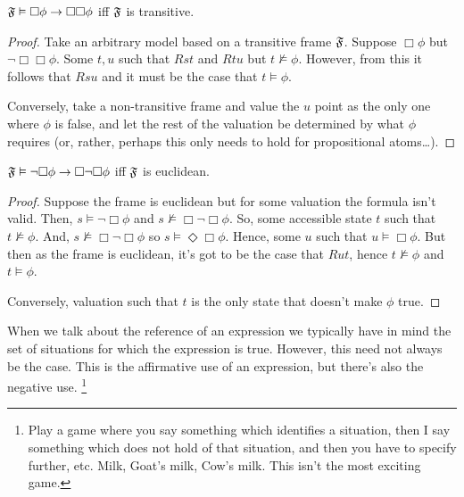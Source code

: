 \documentclass[10pt]{article}
\begin{document}
\begin{proposition}
  \(\mathfrak{F} \vDash \Box\phi \rightarrow \Box\Box\phi\) iff \(\mathfrak{F}\) is transitive.
  \begin{proof}
    Take an arbitrary model based on a transitive frame \(\mathfrak{F}\).
    Suppose \(\Box\phi\) but \(\lnot\Box\Box\phi\).
    Some \(t,u\) such that \(Rst\) and \(Rtu\) but \(t \nvDash \phi\).
    However, from this it follows that \(Rsu\) and it must be the case that \(t \vDash \phi\).

    Conversely, take a non-transitive frame and value the \(u\) point as the only one where \(\phi\) is false, and let the rest of the valuation be determined by what \(\phi\) requires (or, rather, perhaps this only needs to hold for propositional atoms\dots).
  \end{proof}
\end{proposition}

\begin{proposition}
  \(\mathfrak{F} \vDash \lnot\Box\phi \rightarrow \Box\lnot\Box\phi\) iff \(\mathfrak{F}\) is euclidean.
  \begin{proof}
    Suppose the frame is euclidean but for some valuation the formula isn't valid.
    Then, \(s \vDash \lnot\Box\phi\) and \(s \nvDash \Box\lnot\Box\phi\).
    So, some accessible state \(t\) such that \(t \nvDash \phi\).
    And, \(s \nvDash \Box\lnot\Box\phi\) so \(s \vDash \Diamond\Box\phi\).
    Hence, some \(u\) such that \(u \vDash \Box\phi\).
    But then as the frame is euclidean, it's got to be the case that \(Rut\), hence \(t \nvDash \phi\) and \(t \vDash \phi\).

    {\color{red} Conversely, valuation such that \(t\) is the only state that doesn't make \(\phi\) true.}
  \end{proof}
\end{proposition}


\newpage

\hfill
\printbibliography

\newpage

When we talk about the reference of an expression we typically have in mind the set of situations for which the expression is true.
However, this need not always be the case.
This is the affirmative use of an expression, but there's also the negative use.\nolinebreak
\footnote{Play a game where you say something which identifies a situation, then I say something which does not hold of that situation, and then you have to specify further, etc.
  Milk, Goat's milk, Cow's milk.
  This isn't the most exciting game.}
\end{document}
